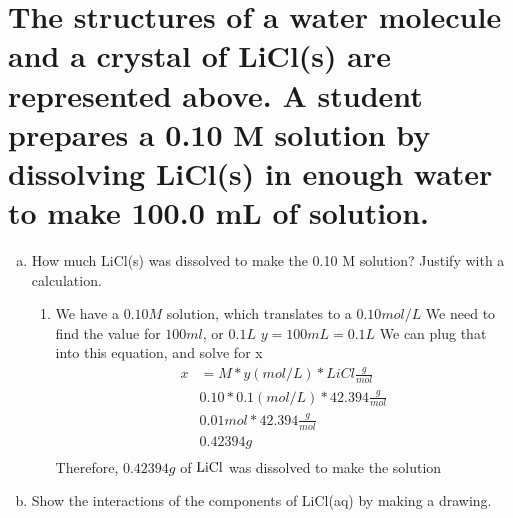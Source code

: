 \documentclass[11pt]{article}
\begin{document}
\section{The structures of a water molecule and a crystal of LiCl(s) are represented above. A student prepares a 0.10 M solution by dissolving LiCl(s) in enough water to make 100.0 mL of solution.}
\label{sec:orgf917132}
\begin{enumerate}[(a)]
\item How much LiCl(s) was dissolved to make the 0.10 M solution? Justify with a
calculation.
\begin{enumerate}
\item We have a \(0.10M\) solution, which translates to  a \(0.10mol/L\)
We need to find the value for \(100ml\), or \(0.1L\)
\(y = 100mL = 0.1L\)
We can plug that into this equation, and solve for x
\begin{align*}
x&= M * y(mol/L) * LiCl\frac{g}{mol}\\
&0.10 * 0.1(mol/L) * 42.394\frac{g}{mol}\\
&0.01mol * 42.394\frac{g}{mol}\\
&0.42394g\\
\end{align*}
Therefore, \(0.42394g\) of \(\ce{LiCl}\) was dissolved to make the solution
\end{enumerate}

\item Show the interactions of the components of LiCl(aq) by making a drawing.
\end{enumerate}
\end{document}
